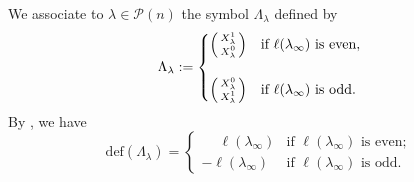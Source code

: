 \documentclass[12pt]{amsart}
\numberwithin{equation}{subsection}
\newcommand{\cP}{\mathcal{P}}
\def\defect{{\mathrm{def}}}
\begin{document}
We associate to $\lambda\in\cP(n)$  the symbol  $\Lambda_\lambda$ defined by
\begin{equation} \label{eqn:symbol-part}
\Lambda_\lambda:=
\begin{cases}
\left(\begin{smallmatrix}X^1_\lambda\cr
X^0_\lambda\end{smallmatrix}\right) & \text{if $\ell(\lambda_\infty)$ is even},\\
\\
\left(\begin{smallmatrix}X^0_\lambda\cr
X^1_\lambda\end{smallmatrix}\right) & \text{if $\ell(\lambda_\infty)$ is odd}.
\end{cases}
\end{equation}
By \cite[Lemma~2.6]{PanUU}, we have
\begin{equation}
\defect(\Lambda_\lambda)=\begin{cases}
\phantom{-}\ell(\lambda_\infty)& \text{if $\ell(\lambda_\infty)$ is even};\\
-\ell(\lambda_\infty)& \text{if $\ell(\lambda_\infty)$ is odd}.
\end{cases}
\end{equation}
\end{document}
